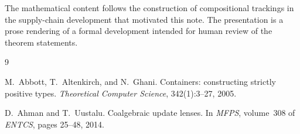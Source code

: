 \documentclass[11pt,a4paper]{article}
\theoremstyle{plain}
\theoremstyle{definition}
\begin{document}
The mathematical content follows the construction of compositional trackings in
the supply-chain development that motivated this note. The presentation is a
prose rendering of a formal development intended for human review of the
theorem statements.

\begin{thebibliography}{9}

M.~Abbott, T.~Altenkirch, and N.~Ghani.
\newblock Containers: constructing strictly positive types.
\newblock \emph{Theoretical Computer Science}, 342(1):3--27, 2005.

D.~Ahman and T.~Uustalu.
\newblock Coalgebraic update lenses.
\newblock In \emph{MFPS}, volume~308 of \emph{ENTCS}, pages 25--48, 2014.

\end{thebibliography}
\end{document}
